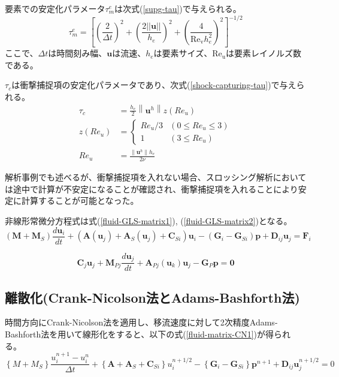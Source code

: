 要素での安定化パラメータ$\tau_{m}^{e}$は次式(\ref{supg-tau})で与えられる。
\begin{equation}
\label{supg-tau}
	\tau_{m}^{e}=\left[ \left(\frac{2}{\Delta t}\right)^{2} + \left(\frac{2||\bm{u}||}{h_{e}}\right)^{2} + \left(\frac{4}{\mathrm{Re_{v}} h_{e}^{2}}\right)^{2}\right]^{-1/2}
\end{equation}
ここで、$\Delta t$は時間刻み幅、$\bm{u}$は流速、$h_e$は要素サイズ、$\mathrm{Re_u}$は要素レイノルズ数である。

$\tau_{c}$は衝撃捕捉項の安定化パラメータであり、次式(\ref{shock-capturing-tau})で与えられる。
\begin{equation}
\label{shock-capturing-tau}
	\begin{aligned} 
		\tau_c & =\frac{h_e}{2}\left\|\bm{u}^h\right\| z\left(R e_u\right) \\ 
		z\left(R e_u\right) & = 
			\begin{cases}
				R e_u / 3 & \left(0 \leq R e_u \leq 3\right) \\ 
				1         & \left(3 \leq R e_u\right)
			\end{cases} \\
		Re_{u} & = \frac{\| \bm{u}^{h} \| h_{e}}{2 \nu}
	\end{aligned}
\end{equation}

解析事例でも述べるが、衝撃捕捉項を入れない場合、スロッシング解析においては途中で計算が不安定になることが確認され、衝撃捕捉項を入れることにより安定に計算することが可能となった。

非線形常微分方程式は式(\ref{fluid-GLS-matrix1}), (\ref{fluid-GLS-matrix2})となる。
\begin{equation}
\label{fluid-GLS-matrix1}
	\left(\bm{M}+\bm{M}_S\right) \frac{d \bm{u}_i}{d t} 
	+ \left(\bm{A}\left(\bm{u}_j\right) + \bm{A}_S\left(\bm{u}_j\right) + \bm{C}_{Si} \right) \bm{u}_i
	- \left(\bm{G}_i-\bm{G}_{S i}\right) \bm{p}
	+ \bm{D}_{i j} \bm{u}_j=\bm{F}_i
\end{equation}

\begin{equation}
\label{fluid-GLS-matrix2}
	\bm{C}_j \bm{u}_j+\bm{M}_{P j} \frac{d \bm{u}_j}{d t}
	+ \bm{A}_{P j}\left(\bm{u}_k\right) \bm{u}_j
	- \bm{G}_P \bm{p}=\mathbf{0}
\end{equation}


\subsection{離散化(Crank-Nicolson法とAdams-Bashforth法)}
時間方向にCrank-Nicolson法を適用し、移流速度に対して2次精度Adams-Bashforth法を用いて線形化をすると、以下の式(\ref{fluid-matrix-CN1})が得られる。
\begin{equation}
\label{fluid-matrix-CN1}
		\left\{M+M_S\right\} \frac{u_i^{n+1}-u_i^n}{\Delta t}
		+ \left\{\bm{A} + \bm{A}_S + \bm{C}_{Si}\right\} u_i^{n+1 / 2}
		- \left\{\bm{G}_i - \bm{G}_{S i}\right\} \bm{p}^{n+1}
		+ \bm{D}_{i j} \bm{u}_j^{n+1 / 2}
		= 0
\end{equation}

